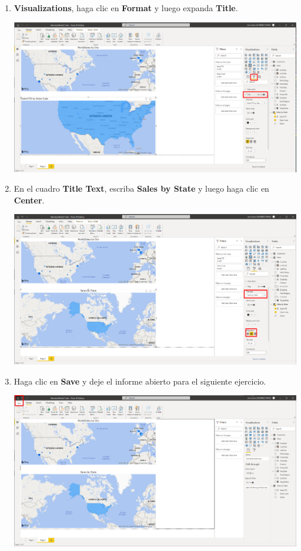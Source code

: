 \documentclass[12pt,letterpaper]{article}
\newcommand\tab[1][1cm]{\hspace*{#1}}
\begin{document}
\begin{enumerate}[\tab 1.]
\begin{center}
        \end{center}
        \item \textbf{Visualizations}, haga clic en \textbf{Format} y luego expanda \textbf{Title}.
        \begin{center}
            \includegraphics[width=13cm]{./img/img134.png}
        \end{center}
        \item En el cuadro \textbf{Title Text}, escriba \textbf{Sales by State} y luego haga clic en \textbf{Center}.
        \begin{center}
            \includegraphics[width=13cm]{./img/img135.png}
        \end{center}
        \item Haga clic en \textbf{Save} y deje el informe abierto para el siguiente ejercicio.
        \begin{center}
            \includegraphics[width=13cm]{./img/img136.png}
        \end{center}
    \end{enumerate}
\end{document}
